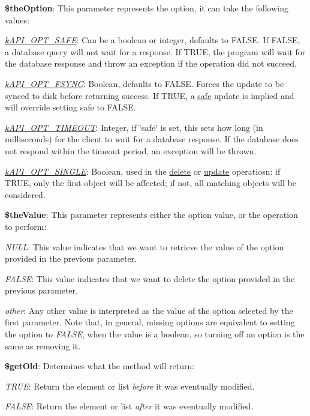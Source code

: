 \begin{DoxyItemize}
\item {\bfseries \$the\-Option}\-: This parameter represents the option, it can take the following values\-: 
\begin{DoxyItemize}
\item {\itshape \hyperlink{}{k\-A\-P\-I\-\_\-\-O\-P\-T\-\_\-\-S\-A\-F\-E}}\-: Can be a boolean or integer, defaults to F\-A\-L\-S\-E. If F\-A\-L\-S\-E, a database query will not wait for a response. If T\-R\-U\-E, the program will wait for the database response and throw an exception if the operation did not succeed. 
\item {\itshape \hyperlink{}{k\-A\-P\-I\-\_\-\-O\-P\-T\-\_\-\-F\-S\-Y\-N\-C}}\-: Boolean, defaults to F\-A\-L\-S\-E. Forces the update to be synced to disk before returning success. If T\-R\-U\-E, a \hyperlink{}{safe} update is implied and will override setting safe to F\-A\-L\-S\-E. 
\item {\itshape \hyperlink{}{k\-A\-P\-I\-\_\-\-O\-P\-T\-\_\-\-T\-I\-M\-E\-O\-U\-T}}\-: Integer, if \char`\"{}safe\char`\"{} is set, this sets how long (in milliseconds) for the client to wait for a database response. If the database does not respond within the timeout period, an exception will be thrown. 
\item {\itshape \hyperlink{}{k\-A\-P\-I\-\_\-\-O\-P\-T\-\_\-\-S\-I\-N\-G\-L\-E}}\-: Boolean, used in the \hyperlink{}{delete} or \hyperlink{}{update} operatiosn\-: if T\-R\-U\-E, only the first object will be affected; if not, all matching objects will be considered. 
\end{DoxyItemize}
\item {\bfseries \$the\-Value}\-: This parameter represents either the option value, or the operation to perform\-: 
\begin{DoxyItemize}
\item {\itshape N\-U\-L\-L}\-: This value indicates that we want to retrieve the value of the option provided in the previous parameter. 
\item {\itshape F\-A\-L\-S\-E}\-: This value indicates that we want to delete the option provided in the previous parameter. 
\item {\itshape other}\-: Any other value is interpreted as the value of the option selected by the first parameter. Note that, in general, missing options are equivalent to setting the option to {\itshape F\-A\-L\-S\-E}, when the value is a boolean, so turning off an option is the same as removing it. 
\end{DoxyItemize}
\item {\bfseries \$get\-Old}\-: Determines what the method will return\-: 
\begin{DoxyItemize}
\item {\itshape T\-R\-U\-E}\-: Return the element or list {\itshape before} it was eventually modified. 
\item {\itshape F\-A\-L\-S\-E}\-: Return the element or list {\itshape after} it was eventually modified. 
\end{DoxyItemize}
\end{DoxyItemize}


